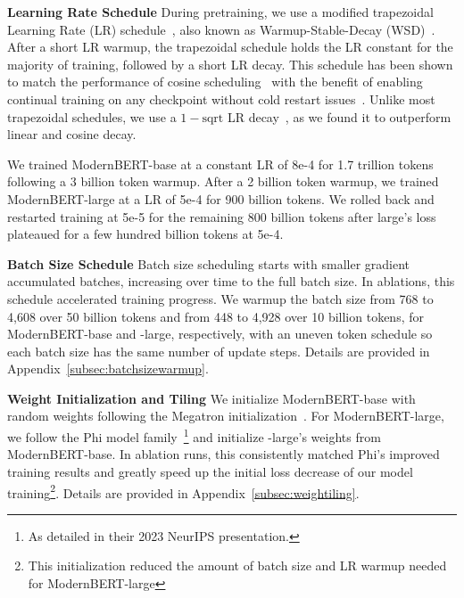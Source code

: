 \documentclass[11pt]{article}
\begin{document}
\textbf{Learning Rate Schedule} During pretraining, we use a modified trapezoidal Learning Rate (LR) schedule~\cite{xing2018walksgd}, also known as Warmup-Stable-Decay (WSD)~\cite{DBLP:conf/cvpr/Zhai0HB22,DBLP:journals/corr/abs-2404-06395}. After a short LR warmup, the trapezoidal schedule holds the LR constant for the majority of training, followed by a short LR decay. This schedule has been shown to match the performance of cosine scheduling~\cite{DBLP:journals/corr/abs-2405-18392,mambaoutai} with the benefit of enabling continual training on any checkpoint without cold restart issues~\cite{DBLP:journals/corr/abs-1910-08475}. Unlike most trapezoidal schedules, we use a $1-\text{sqrt}$ LR decay~\cite{1minussqrt}, as we found it to outperform linear and cosine decay.

We trained ModernBERT-base at a constant LR of 8e-4 for 1.7 trillion tokens following a 3 billion token warmup. After a 2 billion token warmup, we trained ModernBERT-large at a LR of 5e-4 for 900 billion tokens. We rolled back and restarted training at 5e-5 for the remaining 800 billion tokens after large’s loss plateaued for a few hundred billion tokens at 5e-4. 


\textbf{Batch Size Schedule} Batch size scheduling starts with smaller gradient accumulated batches, increasing over time to the full batch size. In ablations, this schedule accelerated training progress. We warmup the batch size from 768 to 4,608 over 50 billion tokens and from 448 to 4,928 over 10 billion tokens, for ModernBERT-base and -large, respectively, with an uneven token schedule so each batch size has the same number of update steps. Details are provided in Appendix~\ref{subsec:batchsizewarmup}.


\textbf{Weight Initialization and Tiling}
We initialize ModernBERT-base with random weights following the Megatron initialization~\cite{megatron}. For ModernBERT-large, we follow the Phi model family~\cite{phi15, phi2}\footnote{As detailed in their 2023 NeurIPS presentation.} and initialize -large’s weights from ModernBERT-base. In ablation runs, this consistently matched Phi's improved training results and greatly speed up the initial loss decrease of our model training\footnote{This initialization reduced the amount of batch size and LR warmup needed for ModernBERT-large}. Details are provided in Appendix~\ref{subsec:weightiling}.
\end{document}
